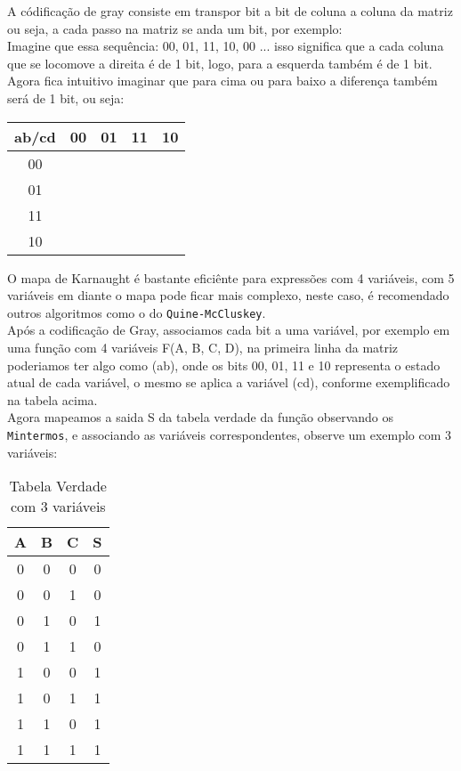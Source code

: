 \documentclass[12pt, onecolumn]{article}
\begin{document}
	A códificação de gray consiste em transpor bit a bit de coluna a coluna da 
	matriz ou seja, a cada passo na matriz se anda um bit, por exemplo: \\
	Imagine que essa sequência: 00, 01, 11, 10, 00 ... isso significa que a cada
	coluna que se locomove a direita é de 1 bit, logo, para a esquerda também é de 
	1 bit. \\
	\newline
	Agora fica intuitivo imaginar que para cima ou para baixo a diferença
	também será de 1 bit, ou seja: \\
	\begin{table}[h]
		\centering
		\begin{tabular}{|c|c|c|c|c|}
			\hline
			ab/cd & 00 & 01 & 11 & 10 \\ \hline
			00  &   &   &  & \\ \hline
			01  &   &   &  & \\ \hline
			11  &   &   &  & \\ \hline
			10  &   &   &  & \\ \hline
		\end{tabular}
	\end{table}
	O mapa de Karnaught é bastante eficiênte para expressões com 4 variáveis, 
	com 5 variáveis em diante o mapa pode ficar mais complexo, neste caso, é 
	recomendado outros algoritmos como o do \texttt{Quine-McCluskey}. \\ 
	\newline
	Após a codificação de Gray, associamos cada bit a uma variável, por exemplo
	em uma função com 4 variáveis F(A, B, C, D), na primeira linha da matriz
	poderiamos ter algo como (ab), onde os bits 00, 01, 11 e 10 representa o 
	estado atual de cada variável, o mesmo se aplica a variável (cd), conforme
	exemplificado na tabela acima. \\
	\newline
	Agora mapeamos a saida S da tabela verdade da função observando os 
	\texttt{Mintermos}, e associando as variáveis correspondentes, observe
	um exemplo com 3 variáveis: \\
	\begin{table}[h]
		\centering
		\begin{tabular}{|c|c|c|c|}
			\hline
			A & B & C & S \\ \hline
			0 & 0 & 0 & 0 \\ \hline
			0 & 0 & 1 & 0 \\ \hline
			0 & 1 & 0 & 1 \\ \hline
			0 & 1 & 1 & 0 \\ \hline
			1 & 0 & 0 & 1 \\ \hline
			1 & 0 & 1 & 1 \\ \hline
			1 & 1 & 0 & 1 \\ \hline
			1 & 1 & 1 & 1 \\ \hline 
		\end{tabular}
		\caption{Tabela Verdade com 3 variáveis}
	\end{table}
\end{document}
